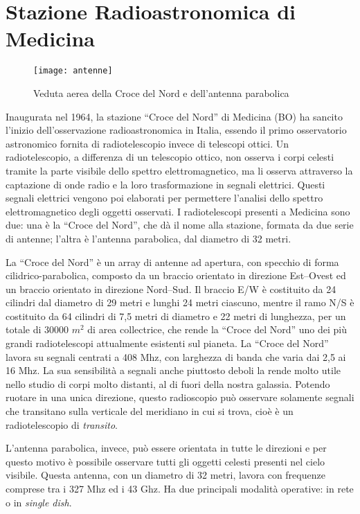 \section*{Stazione Radioastronomica di Medicina}
\begin{figure}[htb]
	\begin{center}
		\texttt{[image: antenne]}
	\end{center}
	\caption{Veduta aerea della Croce del Nord e dell'antenna parabolica}
	\label{fig:rtscopes}
\end{figure}
Inaugurata nel 1964, la stazione ``Croce del Nord'' di Medicina (BO) ha sancito
l'inizio dell'osservazione radioastronomica in Italia, essendo il primo
osservatorio astronomico fornita di radiotelescopio invece di telescopi ottici.
Un radiotelescopio, a differenza di un telescopio ottico, non osserva i corpi
celesti tramite la parte visibile dello spettro elettromagnetico, ma li osserva
attraverso la captazione di onde radio e la loro trasformazione in segnali
elettrici. Questi segnali elettrici vengono poi elaborati per permettere
l'analisi dello spettro elettromagnetico degli oggetti osservati. I
radiotelescopi presenti a Medicina sono due: una \`e la ``Croce del Nord'', che
d\`a il nome alla stazione, formata da due serie di antenne; l'altra \`e
l'antenna parabolica, dal diametro di 32 metri.

La ``Croce del Nord'' \`e un array di antenne ad apertura, con specchio di forma
cilidrico-parabolica, composto da un braccio orientato in direzione Est--Ovest
ed un braccio orientato in direzione Nord--Sud. Il braccio E/W \`e costituito da
24 cilindri dal diametro di 29 metri e lunghi 24 metri ciascuno, mentre il ramo
N/S \`e costituito da 64 cilindri  di 7,5 metri di diametro e 22 metri di
lunghezza, per un totale di 30000 $m^2$ di area collectrice, che rende la
``Croce del Nord'' uno dei pi\`u grandi radiotelescopi attualmente esistenti sul
pianeta. La ``Croce del Nord'' lavora su segnali centrati a 408 Mhz, con
larghezza di banda che varia dai 2,5 ai 16 Mhz. La sua sensibilit\`a a segnali
anche piuttosto deboli la rende molto utile nello studio di corpi molto
distanti, al di fuori della nostra galassia. Potendo ruotare in una unica
direzione, questo radioscopio pu\`o osservare solamente segnali che transitano
sulla verticale del meridiano in cui si trova, cio\`e \`e un radiotelescopio di
\emph{transito}.

L'antenna parabolica, invece, pu\`o essere orientata in tutte le
direzioni e per questo motivo \`e possibile osservare tutti gli oggetti celesti
presenti nel cielo visibile. Questa antenna, con un diametro di 32 metri, lavora
con frequenze comprese tra i 327 Mhz ed i 43 Ghz. Ha due principali modalit\`a
operative: in rete o in \emph{single dish}.

